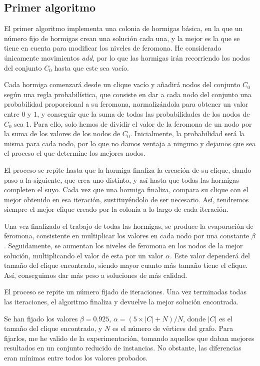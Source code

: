 \subsection{Primer algoritmo}

El primer algoritmo implementa una colonia de hormigas básica, en la que un número
fijo de hormigas crean una solución cada una, y la mejor es la que se tiene en cuenta
para modificar los niveles de feromona. He considerado únicamente movimientos \textit{add},
por lo que las hormigas irán recorriendo los nodos del conjunto $C_0$ hasta que
este sea vacío.

Cada hormiga comenzará desde un clique vacío y añadirá nodos del conjunto $C_0$ según
una regla probabilística, que consiste en dar a cada nodo del conjunto una probabilidad
proporcional a su feromona, normalizándola para obtener un valor entre $0$ y $1$, y
conseguir que la suma de todas las probabilidades de los nodos de $C_0$ sea $1$.
Para ello,  solo hemos de dividir el valor de la feromona de un nodo por la suma de
los valores de los nodos de $C_0$. Inicialmente, la probabilidad será la misma para
cada nodo,  por lo que no damos ventaja a ninguno y dejamos que sea el proceso el
que determine los mejores nodos.

El proceso se repite hasta que la hormiga finaliza la creación de su clique, dando
paso a la siguiente, que crea uno distinto, y así hasta que todas las hormigas completen
el suyo. Cada vez que una hormiga finaliza, compara su clique con el mejor obtenido
en esa iteración, sustituyéndolo de ser necesario. Así, tendremos siempre el mejor
clique creado por la colonia a lo largo de cada iteración.

Una vez finalizado el trabajo de todas las hormigas, se produce la evaporación de
feromona, consistente en multiplicar los valores en cada nodo por una constante $\beta$.
Seguidamente, se aumentan los niveles de feromona en los nodos de la mejor solución,
multiplicando el valor de esta por un valor $\alpha$. Este valor dependerá del tamaño
del clique encontrado, siendo mayor cuanto más tamaño tiene el clique. Así, conseguimos
dar más peso a soluciones de más calidad.

El proceso se repite un número fijado de iteraciones. Una vez terminadas todas las
iteraciones, el algoritmo finaliza y devuelve la mejor solución encontrada.

Se han fijado los valores $\beta = 0.925$, $\alpha = (5 \times |C| + N) / N$, donde
$|C|$ es el tamaño del clique encontrado, y $N$ es el número de vértices del grafo.
Para fijarlos, me he valido de la experimentación, tomando aquellos que daban mejores
resultados en un conjunto reducido de instancias. No obstante, las diferencias
eran mínimas entre todos los valores probados.

